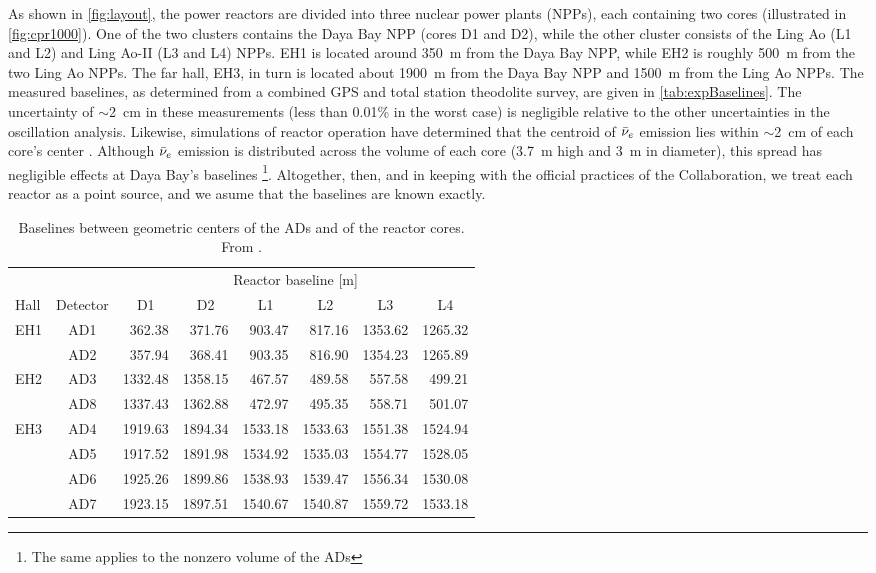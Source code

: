\documentclass[../thesis.tex]{subfiles}
\begin{document}
As shown in \autoref{fig:layout}, the power reactors are divided into three nuclear power plants (NPPs), each containing two cores (illustrated in \autoref{fig:cpr1000}). One of the two clusters contains the Daya Bay NPP (cores D1 and D2), while the other cluster consists of the Ling Ao (L1 and L2) and Ling Ao-II (L3 and L4) NPPs. EH1 is located around 350~m from the Daya Bay NPP, while EH2 is roughly 500~m from the two Ling Ao NPPs. The far hall, EH3, in turn is located about 1900~m from the Daya Bay NPP and 1500~m from the Ling Ao NPPs. The measured baselines, as determined from a combined GPS and total station theodolite survey, are given in \autoref{tab:expBaselines}. The uncertainty of $\sim$2~cm in these measurements (less than 0.01\% in the worst case) is negligible relative to the other uncertainties in the oscillation analysis.  Likewise, simulations of reactor operation have determined that the centroid of $\bar\nu_e$ emission lies within $\sim$2~cm of each core's center \cite{An_2017}. Although $\bar\nu_e$ emission is distributed across the volume of each core (3.7~m high and 3~m in diameter), this spread has negligible effects at Daya Bay's baselines \cite{An_2017}\footnote{The same applies to the nonzero volume of the ADs}. Altogether, then, and in keeping with the official practices of the Collaboration, we treat each reactor as a point source, and we asume that the baselines are known exactly.

\begin{table}[ht]
  \begin{tabular}{lcrrrrrr}
    \toprule
    \multicolumn{2}{c}{} & \multicolumn{6}{c}{Reactor baseline [m]} \\
    \cmidrule{3-8}
    Hall & Detector & \multicolumn{1}{c}{D1} & \multicolumn{1}{c}{D2} & \multicolumn{1}{c}{L1} & \multicolumn{1}{c}{L2} & \multicolumn{1}{c}{L3} & \multicolumn{1}{c}{L4} \\
    \midrule
    EH1  & AD1      & 362.38  & 371.76  & 903.47  & 817.16  & 1353.62 & 1265.32 \\
         & AD2      & 357.94  & 368.41  & 903.35  & 816.90  & 1354.23 & 1265.89 \\
    EH2  & AD3      & 1332.48 & 1358.15 & 467.57  & 489.58  & 557.58  & 499.21  \\
         & AD8      & 1337.43 & 1362.88 & 472.97  & 495.35  & 558.71  & 501.07  \\
    EH3  & AD4      & 1919.63 & 1894.34 & 1533.18 & 1533.63 & 1551.38 & 1524.94 \\
         & AD5      & 1917.52 & 1891.98 & 1534.92 & 1535.03 & 1554.77 & 1528.05 \\
         & AD6      & 1925.26 & 1899.86 & 1538.93 & 1539.47 & 1556.34 & 1530.08 \\
         & AD7      & 1923.15 & 1897.51 & 1540.67 & 1540.87 & 1559.72 & 1533.18 \\
    \bottomrule
  \end{tabular}
  \caption{Baselines between geometric centers of the ADs and of the reactor cores. From \cite{An_2017}.}
  \label{tab:expBaselines}
\end{table}
\end{document}
